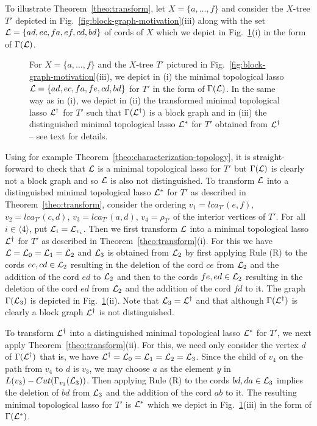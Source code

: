To illustrate Theorem~\ref{theo:transform}, let $X=\{a,\ldots, f\}$ and
consider the $X$-tree $T'$ depicted in
Fig.~\ref{fig:block-graph-motivation}(iii) along with the set
${\mathcal L}=\{ad,ec,fa,ef,cd,bd\}$ of cords of $X$ which we depict in
Fig.~\ref{fig:transformation}(i) in the form of $\Gamma({\mathcal L})$.
%
\begin{figure}[h]
  \begin{center}
    
  \end{center}
  \caption{ For $X=\{a,\ldots, f\}$ and the $X$-tree $T'$ pictured in
    Fig.~\ref{fig:block-graph-motivation}(iii), we depict in (i) the minimal
    topological lasso ${\mathcal L}=\{ad,ec,fa,fe,cd,bd\}$ for $T'$ in the form of
    $\Gamma({\mathcal L})$.  In the same way as in (i), we depict in (ii) the
    transformed minimal topological lasso ${\mathcal L}^{\dagger}$ for $T'$ such that
    $\Gamma({\mathcal L}^{\dagger})$ is a block graph and in (iii) the distinguished
    minimal topological lasso ${\mathcal L}^*$ for $T'$ obtained from ${\mathcal L}^{\dagger}$
    -- see text for details.}
  \label{fig:transformation}
\end{figure}
%
Using for example Theorem~\ref{theo:characterization-topology}, it is
straight-forward to check that ${\mathcal L}$ is a minimal topological lasso for $T'$
but $\Gamma({\mathcal L})$ is clearly not a block graph and so ${\mathcal L}$ is also not
distinguished. To transform ${\mathcal L}$ into a distinguished minimal topological
lasso ${\mathcal L}^*$ for $T'$ as described in Theorem~\ref{theo:transform}, consider
the ordering $v_1=lca_{T'}(e,f)$, $v_2=lca_{T'}(c,d)$, $v_3=lca_{T'}(a,d)$,
$v_4=\rho_{T'}$ of the interior vertices of $T'$. For all $i\in\langle
4\rangle$, put ${\mathcal L}_i={\mathcal L}_{v_i}$. Then we first transform ${\mathcal L}$ into a minimal
topological lasso ${\mathcal L}^{\dagger}$ for $T'$ as described in
Theorem~\ref{theo:transform}(i). For this we have ${\mathcal L}={\mathcal L}_0={\mathcal L}_1={\mathcal L}_2$ and
${\mathcal L}_3$ is obtained from ${\mathcal L}_2$ by first applying Rule (R) to the cords $ec,
cd \in {\mathcal L}_2$ resulting in the deletion of the cord $ce$ from ${\mathcal L}_2 $ and the
addition of the cord $ed$ to ${\mathcal L}_2$ and then to the cords $fe,ed\in{\mathcal L}_2$
resulting in the deletion of the cord $ed$ from ${\mathcal L}_2$ and the addition of
the cord $fd$ to it. The graph $\Gamma({\mathcal L}_3)$ is depicted in
Fig.~\ref{fig:transformation}(ii).  Note that ${\mathcal L}_3={\mathcal L}^{\dagger}$ and that
although $\Gamma({\mathcal L}^{\dagger})$ is clearly a block graph ${\mathcal L}^{\dagger}$ is
not distinguished.

To transform ${\mathcal L}^{\dagger}$ into a distinguished minimal topological lasso
${\mathcal L}^*$ for $T'$, we next apply Theorem~\ref{theo:transform}(ii). For this, we
need only consider the vertex $d$ of $\Gamma({\mathcal L}^{\dagger})$ that is, we have
${\mathcal L}^{\dagger}={\mathcal L}_0={\mathcal L}_1={\mathcal L}_2={\mathcal L}_3$.  Since the child of $v_4$ on the path
from $v_4$ to $d$ is $v_3$, we may choose $a$ as the element $y$ in
$L(v_3)-Cut(\Gamma_{v_3}({\mathcal L}_3))$. Then applying Rule (R) to the cords
$bd,da\in {\mathcal L}_3$ implies the deletion of $bd$ from ${\mathcal L}_3$ and the addition of
the cord $ab$ to it. The resulting minimal topological lasso for $T'$ is
${\mathcal L}^*$ which we depict in Fig.~\ref{fig:transformation}(iii) in the form of
$\Gamma({\mathcal L}^*)$.
 

